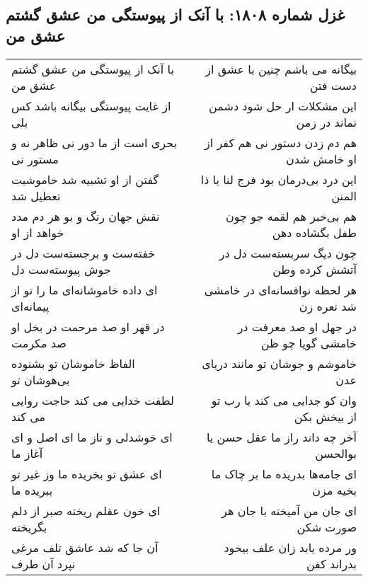 \begin{center}
\section*{غزل شماره ۱۸۰۸: با آنک از پیوستگی من عشق گشتم عشق من}
\label{sec:1808}
\begin{longtable}{l p{0.5cm} r}
با آنک از پیوستگی من عشق گشتم عشق من
&&
بیگانه می باشم چنین با عشق از دست فتن
\\
از غایت پیوستگی بیگانه باشد کس بلی
&&
این مشکلات ار حل شود دشمن نماند در زمن
\\
بحری است از ما دور نی ظاهر نه و مستور نی
&&
هم دم زدن دستور نی هم کفر از او خامش شدن
\\
گفتن از او تشبیه شد خاموشیت تعطیل شد
&&
این درد بی‌درمان بود فرج لنا یا ذا المنن
\\
نقش جهان رنگ و بو هر دم مدد خواهد از او
&&
هم بی‌خبر هم لقمه جو چون طفل بگشاده دهن
\\
خفته‌ست و برجسته‌ست دل در جوش پیوسته‌ست دل
&&
چون دیگ سربسته‌ست دل در آتشش کرده وطن
\\
ای داده خاموشانه‌ای ما را تو از پیمانه‌ای
&&
هر لحظه نوافسانه‌ای در خامشی شد نعره زن
\\
در قهر او صد مرحمت در بخل او صد مکرمت
&&
در جهل او صد معرفت در خامشی گویا چو ظن
\\
الفاظ خاموشان تو بشنوده بی‌هوشان تو
&&
خاموشم و جوشان تو مانند دریای عدن
\\
لطفت خدایی می کند حاجت روایی می کند
&&
وان کو جدایی می کند یا رب تو از بیخش بکن
\\
ای خوشدلی و ناز ما ای اصل و ای آغاز ما
&&
آخر چه داند راز ما عقل حسن یا بوالحسن
\\
ای عشق تو بخریده ما وز غیر تو ببریده ما
&&
ای جامه‌ها بدریده ما بر چاک ما بخیه مزن
\\
ای خون عقلم ریخته صبر از دلم بگریخته
&&
ای جان من آمیخته با جان هر صورت شکن
\\
آن جا که شد عاشق تلف مرغی نپرد آن طرف
&&
ور مرده یابد زان علف بیخود بدراند کفن
\\
\end{longtable}
\end{center}
